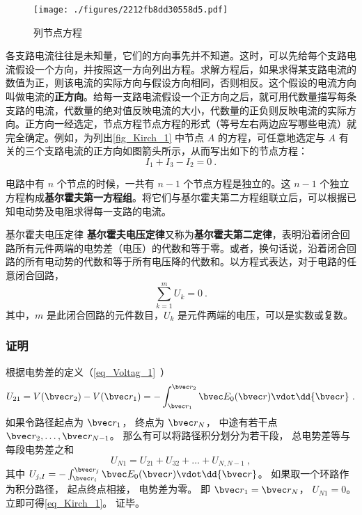 \begin{example}{}

\begin{figure}[ht]
\centering
\texttt{[image: ./figures/2212fb8dd30558d5.pdf]}
\caption{列节点方程} \label{fig_Kirch_1}
\end{figure}
各支路电流往往是未知量，它们的方向事先并不知道。这时，可以先给每个支路电流假设一个方向，并按照这一方向列出方程。求解方程后，如果求得某支路电流的数值为正，则该电流的实际方向与假设方向相同，否则相反。这个假设的电流方向叫做电流的\textbf{正方向}。给每一支路电流假设一个正方向之后，就可用代数量描写每条支路的电流，代数量的绝对值反映电流的大小，代数量的正负则反映电流的实际方向。正方向一经选定，节点方程节点方程的形式（等号左右两边应写哪些电流）就完全确定。例如，为列出\autoref{fig_Kirch_1} 中节点 $A$ 的方程，可任意地选定与 $A $ 有关的三个支路电流的正方向如图箭头所示，从而写出如下的节点方程：
\begin{equation}
I_1+I_3-I_2=0~.
\end{equation}
\end{example}
电路中有 $n$ 个节点的时候，一共有 $n-1$ 个节点方程是独立的。这 $n-1$ 个独立方程构成\textbf{基尔霍夫第一方程组}。将它们与基尔霍夫第二方程组联立后，可以根据已知电动势及电阻求得每一支路的电流。

\begin{theorem}{基尔霍夫电压定律}
\textbf{基尔霍夫电压定律}又称为\textbf{基尔霍夫第二定律}，表明沿着闭合回路所有元件两端的电势差（电压）的代数和等于零。或者，换句话说，沿着闭合回路的所有电动势的代数和等于所有电压降的代数和。以方程式表达，对于电路的任意闭合回路，
\begin{equation}\label{eq_Kirch_1}
\sum_{k=1}^m U_k = 0~.
\end{equation}
其中，$m$ 是此闭合回路的元件数目，$U_k$ 是元件两端的电压，可以是实数或复数。
\end{theorem}

\subsubsection{证明}
根据电势差的定义（\autoref{eq_Voltag_1}~）
\begin{equation}
U_{21} = V(\bvec r_2) - V(\bvec r_1) = - \int_{\bvec r_1}^{\bvec r_2} \bvec E_0(\bvec r) \vdot \dd{\bvec r}~.
\end{equation}
如果令路径起点为 $\bvec r_1$， 终点为 $\bvec r_N$， 中途有若干点 $\bvec r_2, \dots, \bvec r_{N-1}$。 那么有可以将路径积分划分为若干段， 总电势差等与每段电势差之和
\begin{equation}
U_{N1} = U_{21} + U_{32} + \dots + U_{N, N-1}~,
\end{equation}
其中 $U_{j, I} = - \int_{\bvec r_i}^{\bvec r_{j}} \bvec E_0(\bvec r) \vdot \dd{\bvec r}$。
如果取一个环路作为积分路径， 起点终点相接， 电势差为零。 即 $\bvec r_1 = \bvec r_N$， $U_{N1} = 0$。 立即可得\autoref{eq_Kirch_1}。 证毕。

